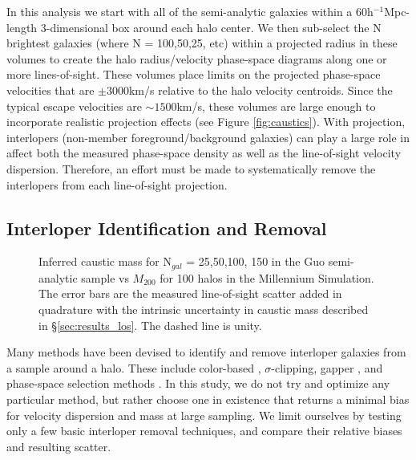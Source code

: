 \documentclass[iop]{emulateapj}
\begin{document}
In this analysis we start with all of the semi-analytic galaxies within a 60h$^{-1}$Mpc-length 3-dimensional box around each halo center. We then sub-select the N brightest galaxies (where N = 100,50,25, etc) within a projected radius in these volumes to create the halo radius/velocity phase-space diagrams along one or more lines-of-sight. These volumes place limits on the projected phase-space velocities that are $\pm 3000$km/s relative to the halo velocity centroids. Since the typical escape velocities are $\sim 1500$km/s, these volumes are large enough to incorporate realistic projection effects (see Figure \ref{fig:caustics}). With projection, interlopers (non-member foreground/background galaxies) can play a large role in affect both the measured phase-space density as well as the line-of-sight velocity dispersion. Therefore, an effort must be made to systematically remove the interlopers from each line-of-sight projection.

\subsection{Interloper Identification and Removal}
\label{sec:interloper_removal}
\begin{figure*}
 \caption{Inferred caustic mass for N$_{gal}$ = 25,50,100, 150 in the Guo semi-analytic sample vs $M_{200}$ for 100 halos in the Millennium Simulation. The error bars are the measured line-of-sight scatter added in quadrature with the intrinsic uncertainty in caustic mass described in  \S \ref{sec:results_los}. The dashed line is unity.
\label{fig:MvsM}}
\end{figure*}
Many methods have been devised to identify and remove interloper galaxies from a sample around a halo. These include color-based \citep{Miller05}, $\sigma$-clipping, gapper \citep{Fadda96}, and phase-space selection methods \citep{Serra13}. In this study, we do not try and optimize any particular method, but rather choose one in existence that returns a minimal bias for velocity dispersion and mass at large sampling. We limit ourselves by testing only a few basic interloper removal techniques, and compare their relative biases and resulting scatter.
\end{document}
